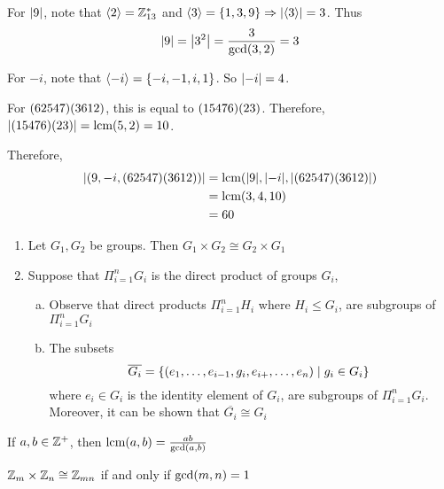 \begin{solution}
    For $\qty|9|$, note that $\langle 2 \rangle = \mathbb{Z}_{13}^{\ast}$ and $\langle 3 \rangle = \qty{1, 3, 9} \Rightarrow \qty|\langle 3 \rangle| = 3$. Thus
    \[ \qty|9| = \qty|3^2| =  \frac{3}{\text{gcd} \qty(3, 2)} = 3 \]
    
    For $-i$, note that $\langle -i \rangle = \qty{-i, -1, i, 1}$. So $\qty|-i| = 4$. 
    
    For $\qty(62547) \qty(3612)$, this is equal to $\qty(15476) \qty(23)$. Therefore, $\qty|\qty(15476) \qty(23)| = \text{lcm} \qty(5, 2) = 10$.
    
    Therefore, 
    \begin{align*}
        \qty|\qty(9, -i, \qty(62547)\qty(3612))| &= \text{lcm}\qty(\qty|9|, \qty|-i|, \qty|\qty(62547)\qty(3612)|) \\
        &= \text{lcm} \qty(3, 4, 10) \\
        &= 60
    \end{align*}
\end{solution}

\begin{remark} \phantom{blank}
    \begin{enumerate}
        \item Let $G_1, G_2$ be groups. Then $G_1 \times G_2 \cong G_2 \times G_1$
        \item Suppose that $\Pi_{i = 1}^{n} G_i$ is the direct product of groups $G_i$,
        \begin{enumerate}[(a)]
            \item Observe that direct products $\Pi_{i = 1}^{n} H_i$ where $H_i \leq G_i$, are subgroups of $\Pi_{i = 1}^{n} G_i$
            \item The subsets 
            \[ \overline{G_i} = \qty{\qty(e_1, \ldots, e_{i-1}, g_i, e_{i+}, \ldots, e_n) \mid g_i \in G_i} \ \]
            where $e_i \in G_i$ is the identity element of $G_i$, are subgroups of $\Pi_{i = 1}^{n} G_i$. Moreover, it can be shown that $\overline{G_i} \cong G_i$
        \end{enumerate}
    \end{enumerate}
\end{remark}

\begin{recall}
    If $a, b \in \mathbb{Z}^+$, then $\text{lcm} \qty(a, b) = \frac{ab}{\text{gcd}\qty(a, b)}$
\end{recall}

\begin{theorem}
    $\mathbb{Z}_m \times \mathbb{Z}_n \cong \mathbb{Z}_{mn}$ if and only if $\text{gcd}\qty(m,n) = 1$
\end{theorem}

